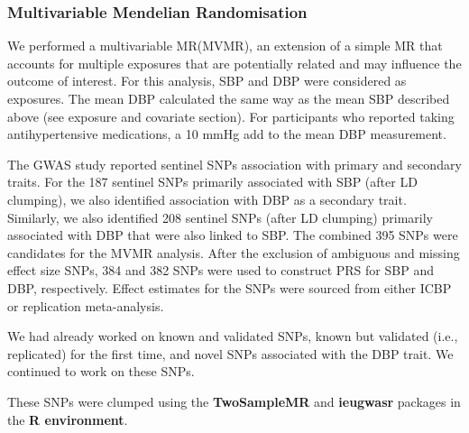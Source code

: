 \documentclass[11pt]{article}
\newcounter{subsubsubsection}[subsubsection]
\begin{document}
\subsubsection{Multivariable Mendelian Randomisation}

We performed a multivariable MR(MVMR), an extension of a simple MR that accounts for multiple exposures that are potentially related and may influence the outcome of interest\cite{burgess2015multivariable, sanderson2019examination, sanderson2021multivariable}. For this analysis, SBP and DBP were considered as exposures. The mean DBP calculated the same way as the mean SBP described above (see exposure and covariate section). For participants who reported taking antihypertensive medications, a 10 mmHg add to the mean DBP measurement\cite{evangelou2018genetic, wan2021blood, tobin2005adjusting, warren2017genome}.

The GWAS study reported sentinel SNPs association with primary and secondary traits\cite{evangelou2018genetic}. For the 187 sentinel SNPs primarily associated with SBP (after LD clumping), we also identified association with DBP as a secondary trait. Similarly, we also identified 208 sentinel SNPs (after LD clumping) primarily associated with DBP that were also linked to SBP. The combined 395 SNPs were candidates for the MVMR analysis. After the exclusion of ambiguous and missing effect size SNPs, 384 and 382 SNPs were used to construct PRS for SBP and DBP, respectively. Effect estimates for the SNPs were sourced from either ICBP or replication meta-analysis. 


We had already worked on known and validated SNPs, known but validated (i.e., replicated) for the first time, and novel SNPs associated with the DBP trait. We continued to work on these SNPs.

These SNPs were clumped using the \textbf{TwoSampleMR} and \textbf{ieugwasr} packages in the \textbf{R environment}.
\color{black}

\end{document}
